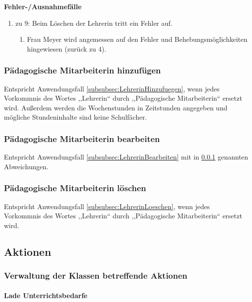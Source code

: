 \documentclass[fontsize=12pt,paper=a4,twoside]{scrartcl}
\begin{document}
\textbf{Fehler-/Ausnahmefälle}
\begin{enumerate}
\item zu 9: Beim Löschen der Lehrerin tritt ein Fehler auf.
	\begin{enumerate}[label=\arabic*.]
	\item Frau Meyer wird angemessen auf den Fehler und Behebungsmöglichkeiten hingewiesen (zurück zu 4).
	\end{enumerate}
\end{enumerate}

\subsubsection{Pädagogische Mitarbeiterin hinzufügen}
\label{subsubsec:PaedMitarbeiterinHinzufuegen}
Entspricht Anwendungsfall \ref{subsubsec:LehrerinHinzufuegen}, wenn jedes Vorkommnis des Wortes ,,Lehrerin`` durch ,,Pädagogische Mitarbeiterin`` ersetzt wird. Außerdem werden die Wochenstunden in Zeitstunden angegeben und mögliche Stundeninhalte sind keine Schulfächer.


\subsubsection{Pädagogische Mitarbeiterin bearbeiten}
\label{subsubsec:PaedMitarbeiterinBearbeiten}
Entspricht Anwendungsfall \ref{subsubsec:LehrerinBearbeiten} mit in \ref{subsubsec:PaedMitarbeiterinHinzufuegen} genannten Abweichungen. 


\label{subsubsec:PaedMitarbeiterinLoeschen}
\subsubsection{Pädagogische Mitarbeiterin löschen}
Entspricht Anwendungsfall \ref{subsubsec:LehrerinLoeschen}, wenn jedes Vorkommnis des Wortes ,,Lehrerin`` durch ,,Pädagogische Mitarbeiterin`` ersetzt wird. 

\subsection{Aktionen}

\subsubsection{Verwaltung der Klassen betreffende Aktionen}

\paragraph{Lade Unterrichtsbedarfe}\mbox{}\\
\end{document}
